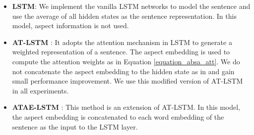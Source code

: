 \documentclass[11pt,a4paper]{article}
\begin{document}
\begin{itemize}
\item {\bf LSTM}: We implement the vanilla LSTM networks to model the sentence and use the average of all hidden states as the sentence representation. In this model, aspect information is not used.

\vspace{-6pt}
\item {\bf AT-LSTM} \cite{Wang2016Attention}: It adopts the attention mechanism in LSTM to generate a weighted representation of a sentence. The aspect embedding is used to compute the attention weights as in Equation \ref{equation_absa_att}. We do not concatenate the aspect embedding to the hidden state as in \cite{Wang2016Attention} and gain small performance improvement. We use this modified version of AT-LSTM in all experiments. 

\vspace{-6pt}
\item {\bf ATAE-LSTM} \cite{Wang2016Attention}: This method is an extension of AT-LSTM. In this model, the aspect embedding is concatenated to each word embedding of the sentence as the input to the LSTM layer. 

\end{itemize}

\begin{table}[t!]
\setlength{\abovecaptionskip}{0.0cm}   %
\setlength{\belowcaptionskip}{-0.2cm}   %
\begin{center}
\end{center}
\caption{\label{table-st} Results of the ALSC task in terms of accuracy ($\%$). All methods are run in single-task settings.}	
\end{table}
\end{document}
